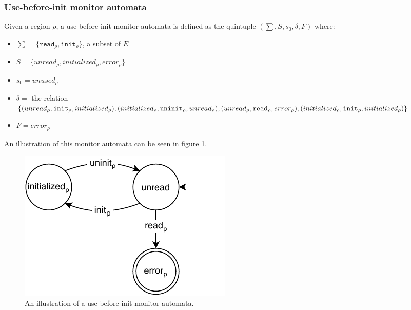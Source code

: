 \subsubsection{Use-before-init monitor automata}

Given a region $\rho$, a use-before-init monitor automata is defined as the quintuple $(\sum, S, s_0, \delta, F)$ where: 

\begin{itemize}
    \item $\sum = \{\texttt{read}_\rho, \texttt{init}_\rho\}$, a subset of $E$
    \item $S = \{ unread_\rho, initialized_\rho, error_\rho \}$
    \item $s_0 = unused_\rho$ 
    \item $\delta =$ the relation $\{(unread_\rho, \texttt{init}_\rho, initialized_\rho), (initialized_\rho, \texttt{uninit}_\rho, unread_\rho), \\
    (unread_\rho, \texttt{read}_\rho, error_\rho), (initialized_\rho, \texttt{init}_\rho, initialized_\rho)\}$ 
    \item $F = error_\rho$  
\end{itemize}

An illustration of this monitor automata can be seen in figure \ref{use-before-automata}. 

\begin{figure}[H]
    \centering
    \includegraphics[width=0.5\textwidth]{background/figures/use-before}
    \caption{An illustration of a use-before-init monitor automata.}
    \label{use-before-automata}
\end{figure}